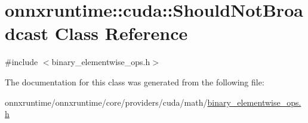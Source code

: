 \hypertarget{classonnxruntime_1_1cuda_1_1ShouldNotBroadcast}{}\section{onnxruntime\+:\+:cuda\+:\+:Should\+Not\+Broadcast Class Reference}
\label{classonnxruntime_1_1cuda_1_1ShouldNotBroadcast}


{\ttfamily \#include $<$binary\+\_\+elementwise\+\_\+ops.\+h$>$}



The documentation for this class was generated from the following file\+:\begin{DoxyCompactItemize}
\item 
onnxruntime/onnxruntime/core/providers/cuda/math/\mbox{\hyperlink{binary__elementwise__ops_8h}{binary\+\_\+elementwise\+\_\+ops.\+h}}\end{DoxyCompactItemize}
